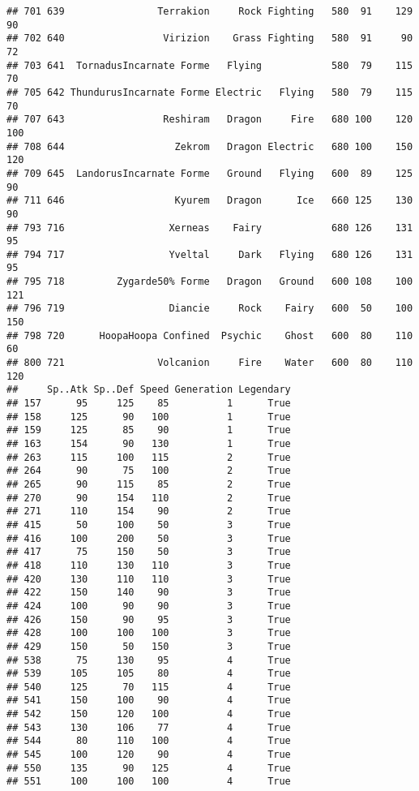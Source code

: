 \documentclass[
]{article}
\begin{document}
\begin{verbatim}
## 701 639                Terrakion     Rock Fighting   580  91    129      90
## 702 640                 Virizion    Grass Fighting   580  91     90      72
## 703 641  TornadusIncarnate Forme   Flying            580  79    115      70
## 705 642 ThundurusIncarnate Forme Electric   Flying   580  79    115      70
## 707 643                 Reshiram   Dragon     Fire   680 100    120     100
## 708 644                   Zekrom   Dragon Electric   680 100    150     120
## 709 645  LandorusIncarnate Forme   Ground   Flying   600  89    125      90
## 711 646                   Kyurem   Dragon      Ice   660 125    130      90
## 793 716                  Xerneas    Fairy            680 126    131      95
## 794 717                  Yveltal     Dark   Flying   680 126    131      95
## 795 718         Zygarde50% Forme   Dragon   Ground   600 108    100     121
## 796 719                  Diancie     Rock    Fairy   600  50    100     150
## 798 720      HoopaHoopa Confined  Psychic    Ghost   600  80    110      60
## 800 721                Volcanion     Fire    Water   600  80    110     120
##     Sp..Atk Sp..Def Speed Generation Legendary
## 157      95     125    85          1      True
## 158     125      90   100          1      True
## 159     125      85    90          1      True
## 163     154      90   130          1      True
## 263     115     100   115          2      True
## 264      90      75   100          2      True
## 265      90     115    85          2      True
## 270      90     154   110          2      True
## 271     110     154    90          2      True
## 415      50     100    50          3      True
## 416     100     200    50          3      True
## 417      75     150    50          3      True
## 418     110     130   110          3      True
## 420     130     110   110          3      True
## 422     150     140    90          3      True
## 424     100      90    90          3      True
## 426     150      90    95          3      True
## 428     100     100   100          3      True
## 429     150      50   150          3      True
## 538      75     130    95          4      True
## 539     105     105    80          4      True
## 540     125      70   115          4      True
## 541     150     100    90          4      True
## 542     150     120   100          4      True
## 543     130     106    77          4      True
## 544      80     110   100          4      True
## 545     100     120    90          4      True
## 550     135      90   125          4      True
## 551     100     100   100          4      True

\end{verbatim}
\end{document}

